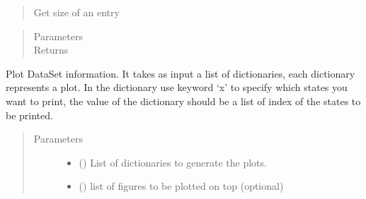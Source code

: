 \documentclass[letterpaper,10pt,english]{sphinxmanual}
\begin{document}
\begin{fulllineitems}
\begin{fulllineitems}
\begin{quote}
Get size of an entry
\end{quote}
\begin{quote}\begin{description}
\item[{Parameters}] \leavevmode
{} \textendash{} 

\item[{Returns}] \leavevmode


\end{description}\end{quote}

\end{fulllineitems}


\begin{fulllineitems}
\label{\detokenize{yaocptool.modelling:yaocptool.modelling.dataset.DataSet.insert_data}}
\end{fulllineitems}


\begin{fulllineitems}
\label{\detokenize{yaocptool.modelling:yaocptool.modelling.dataset.DataSet.plot}}
Plot DataSet information.
It takes as input a list of dictionaries, each dictionary represents a plot.  In the dictionary use keyword ‘x’
to specify which states you want to print, the value of the dictionary should be a list of index of the states
to be printed.
\begin{quote}\begin{description}
\item[{Parameters}] \leavevmode\begin{itemize}
\item {} 
 () \textendash{} List of dictionaries to generate the plots.

\item {} 
 () \textendash{} list of figures to be plotted on top (optional)


\end{itemize}
\end{description}
\end{quote}
\end{fulllineitems}
\end{fulllineitems}
\end{document}
